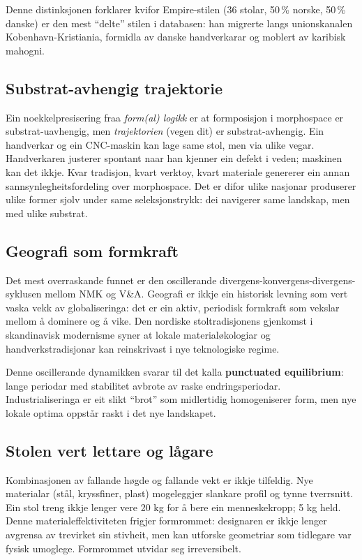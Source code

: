 \documentclass[10pt, a4paper, twocolumn]{article}
\begin{document}
Denne distinksjonen forklarer kvifor Empire-stilen (36 stolar, 50\,\% norske, 50\,\% danske) er den mest ``delte'' stilen i databasen: han migrerte langs unionskanalen Kobenhavn-Kristiania, formidla av danske handverkarar og moblert av karibisk mahogni.

\subsection{Substrat-avhengig trajektorie}

Ein noekkelpresisering fraa \emph{form(al) logikk} er at formposisjon i morphospace er substrat-uavhengig, men \emph{trajektorien} (vegen dit) er substrat-avhengig. Ein handverkar og ein CNC-maskin kan lage same stol, men via ulike vegar. Handverkaren justerer spontant naar han kjenner ein defekt i veden; maskinen kan det ikkje. Kvar tradisjon, kvart verktoy, kvart materiale genererer ein annan sannsynlegheitsfordeling over morphospace. Det er difor ulike nasjonar produserer ulike former sjolv under same seleksjonstrykk: dei navigerer same landskap, men med ulike substrat.

\subsection{Geografi som formkraft}

Det mest overraskande funnet er den oscillerande divergens-konvergens-divergens-syklusen mellom NMK og V\&A. Geografi er ikkje ein historisk levning som vert vaska vekk av globaliseringa: det er ein aktiv, periodisk formkraft som vekslar mellom å dominere og å vike. Den nordiske stoltradisjonens gjenkomst i skandinavisk modernisme syner at lokale materialøkologiar og handverkstradisjonar kan reinskrivast i nye teknologiske regime.

Denne oscillerande dynamikken svarar til det \citet{eldredge1972} kalla \textbf{punctuated equilibrium}: lange periodar med stabilitet avbrote av raske endringsperiodar. Industrialiseringa er eit slikt ``brot'' som midlertidig homogeniserer form, men nye lokale optima oppstår raskt i det nye landskapet.

\subsection{Stolen vert lettare og lågare}

Kombinasjonen av fallande høgde og fallande vekt er ikkje tilfeldig. Nye materialar (stål, kryssfiner, plast) mogeleggjer slankare profil og tynne tverrsnitt. Ein stol treng ikkje lenger vere 20 kg for å bere ein menneskekropp; 5 kg held. Denne materialeffektiviteten frigjer formrommet: designaren er ikkje lenger avgrensa av trevirket sin stivheit, men kan utforske geometriar som tidlegare var fysisk umoglege. Formrommet utvidar seg irreversibelt.
\end{document}
